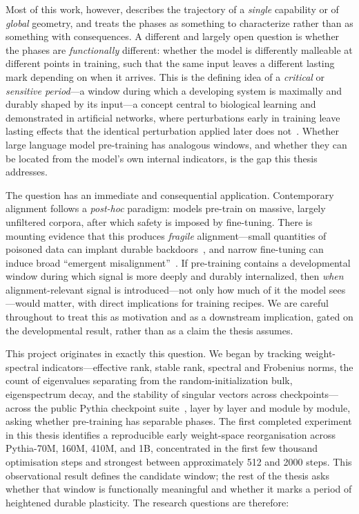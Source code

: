 Most of this work, however, describes the trajectory of a \emph{single} capability or of
\emph{global} geometry, and treats the phases as something to characterize rather than as
something with consequences. A different and largely open question is whether the phases are
\emph{functionally} different: whether the model is differently malleable at different points
in training, such that the same input leaves a different lasting mark depending on when it
arrives. This is the defining idea of a \emph{critical} or \emph{sensitive period}---a window
during which a developing system is maximally and durably shaped by its input---a concept
central to biological learning and demonstrated in artificial networks, where perturbations
early in training leave lasting effects that the identical perturbation applied later does
not~\cite{achille2019critical}. Whether large language model pre-training has analogous
windows, and whether they can be located from the model's own internal indicators, is the gap
this thesis addresses.

The question has an immediate and consequential application. Contemporary alignment follows a
\emph{post-hoc} paradigm: models pre-train on massive, largely unfiltered corpora, after which
safety is imposed by fine-tuning. There is mounting evidence that this produces \emph{fragile}
alignment---small quantities of poisoned data can implant durable backdoors~\cite{poisoning2025},
and narrow fine-tuning can induce broad ``emergent misalignment''~\cite{betley2025emergent}.
If pre-training contains a developmental window during which signal is more deeply and durably
internalized, then \emph{when} alignment-relevant signal is introduced---not only how much of
it the model sees---would matter, with direct implications for training recipes. We are careful
throughout to treat this as motivation and as a downstream implication, gated on the
developmental result, rather than as a claim the thesis assumes.

This project originates in exactly this question. We began by tracking weight-spectral
indicators---effective rank, stable rank, spectral and Frobenius norms, the count of
eigenvalues separating from the random-initialization bulk, eigenspectrum decay, and the
stability of singular vectors across checkpoints---across the public Pythia checkpoint
suite~\cite{biderman2023pythia}, layer by layer and module by module, asking whether
pre-training has separable phases. The first completed experiment in this thesis identifies a
reproducible early weight-space reorganisation across Pythia-70M, 160M, 410M, and 1B,
concentrated in the first few thousand optimisation steps and strongest between approximately
512 and 2000 steps. This observational result defines the candidate window; the rest of the
thesis asks whether that window is functionally meaningful and whether it marks a period of
heightened durable plasticity. The research questions are therefore:

